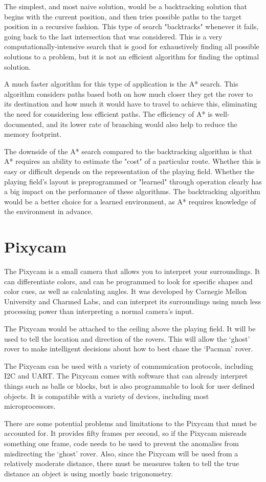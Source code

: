 \documentclass[12pt,letterpaper]{article}
\begin{document}
The simplest, and most naive solution, would be a backtracking solution that begins with the current position, and then tries possible paths to the target position in a recursive fashion. This type of search "backtracks" whenever it fails, going back to the last intersection that was considered. This is a very computationally-intensive search that is good for exhaustively finding all possible solutions to a problem, but it is not an efficient algorithm for finding the optimal solution.
	
A much faster algorithm for this type of application is the A* search. This algorithm considers paths based both on how much closer they get the rover to its destination and how much it would have to travel to achieve this, eliminating the need for considering less efficient paths. The efficiency of A* is well-documented, and its lower rate of branching would also help to reduce the memory footprint.
	
The downside of the A* search compared to the backtracking algorithm is that A* requires an ability to estimate the "cost" of a particular route. Whether this is easy or difficult depends on the representation of the playing field. Whether the playing field's layout is preprogrammed or "learned" through operation clearly has a big impact on the performance of these algorithms. The backtracking algorithm would be a better choice for a learned environment, as A* requires knowledge of the environment in advance.

\section{Pixycam}
The Pixycam is a small camera that allows you to interpret your surroundings. It can differentiate colors, and can be programmed to look for specific shapes and color cues, as well as calculating angles. It was developed by Carnegie Mellon University and Charmed Labs, and can interpret its surroundings using much less processing power than interpreting a normal camera’s input. 

The Pixycam would be attached to the ceiling above the playing field. It will be used to tell the location and direction of the rovers. This will allow the ‘ghost’ rover to make intelligent decisions about how to best chase the ‘Pacman’ rover. 

The Pixycam can be used with a variety of communication protocols, including I2C and UART. The Pixycam comes with software that can already interpret things such as balls or blocks, but is also programmable to look for user defined objects. It is compatible with a variety of devices, including most microprocessors. 

There are some potential problems and limitations to the Pixycam that must be accounted for. It provides fifty frames per second, so if the Pixycam misreads something one frame, code needs to be used to prevent the anomalies from misdirecting the ‘ghost’ rover. Also, since the Pixycam will be used from a relatively moderate distance, there must be measures taken to tell the true distance an object is using mostly basic trigonometry. 
\end{document}
